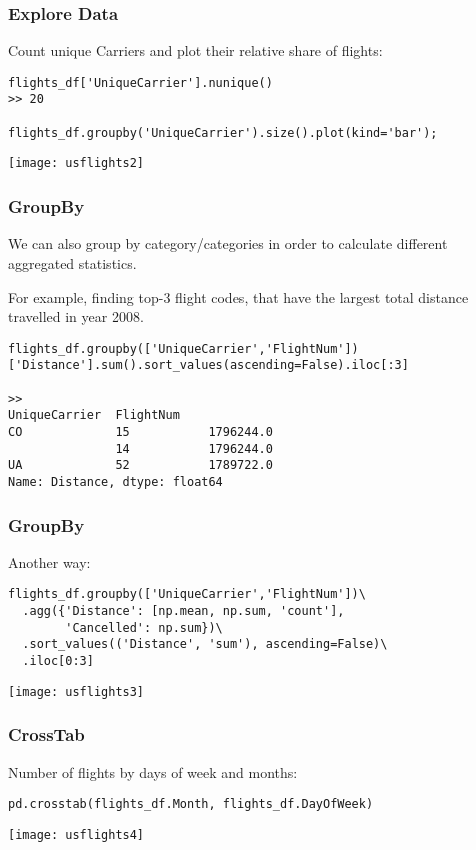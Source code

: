 \begin{frame}[fragile]\frametitle{Explore Data}	
Count unique Carriers and plot their relative share of flights:
\begin{lstlisting}
flights_df['UniqueCarrier'].nunique()
>> 20

flights_df.groupby('UniqueCarrier').size().plot(kind='bar');
\end{lstlisting}
\begin{center}
\texttt{[image: usflights2]}
\end{center}
\end{frame}

\begin{frame}[fragile]\frametitle{GroupBy}	
We can also group by category/categories in order to calculate different aggregated statistics.

For example, finding top-3 flight codes, that have the largest total distance travelled in year 2008.\begin{lstlisting}
flights_df.groupby(['UniqueCarrier','FlightNum'])['Distance'].sum().sort_values(ascending=False).iloc[:3]

>> 
UniqueCarrier  FlightNum
CO             15           1796244.0
               14           1796244.0
UA             52           1789722.0
Name: Distance, dtype: float64
\end{lstlisting}
\end{frame}

\begin{frame}[fragile]\frametitle{GroupBy}	
Another way:
\begin{lstlisting}
flights_df.groupby(['UniqueCarrier','FlightNum'])\
  .agg({'Distance': [np.mean, np.sum, 'count'],
        'Cancelled': np.sum})\
  .sort_values(('Distance', 'sum'), ascending=False)\
  .iloc[0:3]
\end{lstlisting}
\begin{center}
\texttt{[image: usflights3]}
\end{center}
\end{frame}

\begin{frame}[fragile]\frametitle{CrossTab}	
Number of flights by days of week and months:
\begin{lstlisting}
pd.crosstab(flights_df.Month, flights_df.DayOfWeek)
\end{lstlisting}
\begin{center}
\texttt{[image: usflights4]}
\end{center}
\end{frame}

